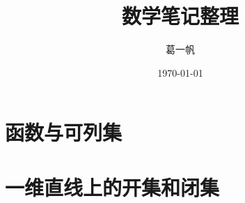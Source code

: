 \documentclass[UTF8]{ctexbook}
\title{数学笔记整理}
\author{葛一帆}
\date{\today}
\begin{document}
\maketitle
\chapter{函数与可列集}
\setcounter{page}{1}

\chapter{一维直线上的开集和闭集}

\end{document}
